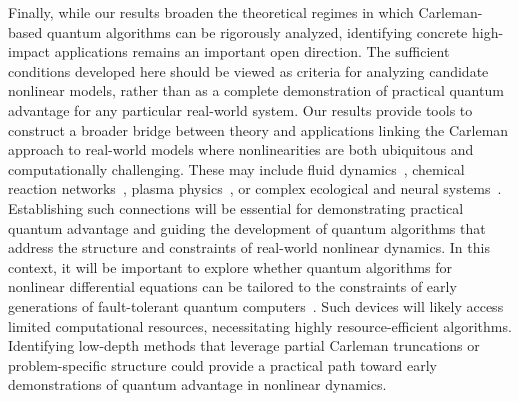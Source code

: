 \documentclass[superscriptaddress,onecolumn,nofootinbib,longbibliography,a4paper,accepted=2026-09-29]{quantumarticle}
\theoremstyle{plain}
\theoremstyle{definition}
\numberwithin{thm}{section}
\numberwithin{assumption}{section}
\numberwithin{lemma}{section}
\numberwithin{prop}{section}
\numberwithin{cor}{section}
\numberwithin{definition}{section}
\numberwithin{rmk}{section}
\numberwithin{equation}{section}
\begin{document}
Finally, while our results broaden the theoretical regimes in which Carleman-based quantum algorithms can be rigorously analyzed, identifying concrete high-impact applications remains an important open direction. The sufficient conditions developed here should be viewed as criteria for analyzing candidate nonlinear models, rather than as a complete demonstration of practical quantum advantage for any particular real-world system. Our results provide tools to construct a broader bridge between theory and applications linking the Carleman approach to real-world models where nonlinearities are both ubiquitous and computationally challenging. These may include fluid dynamics~\cite{batchelor2000introduction, pozrikidis2009fluid}, chemical reaction networks~\cite{feinberg2019foundations}, plasma physics~\cite{tajima2018computational}, or complex ecological and neural systems~\cite{meron2015nonlinear}. Establishing such connections will be essential for demonstrating practical quantum advantage and guiding the development of quantum algorithms that address the structure and constraints of real-world nonlinear dynamics. In this context, it will be important to explore whether quantum algorithms for nonlinear differential equations can be tailored to the constraints of early generations of fault-tolerant quantum computers~\cite{lin2022heisenberg, dong2022groundstate, zhang2022computingground, wang2022statepreparation, wang2023quantumalgorithm, katabarwa2024early, wang2025efficient}. Such devices will likely access limited computational resources, necessitating highly resource-efficient algorithms. Identifying low-depth methods that leverage partial Carleman truncations or problem-specific structure could provide a practical path toward early demonstrations of quantum advantage in nonlinear dynamics.

\end{document}
